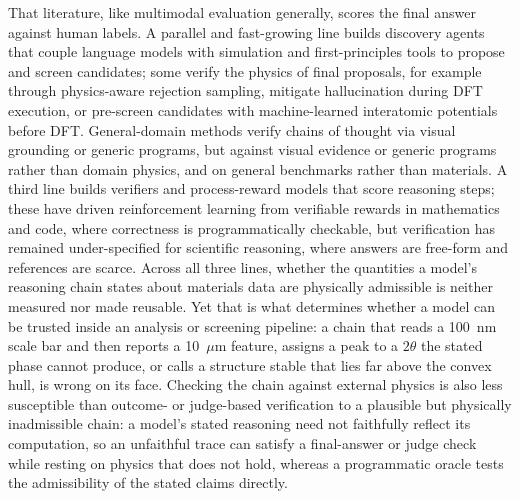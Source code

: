\documentclass[pdflatex,sn-nature]{sn-jnl}
\newcommand{\rev}[1]{#1}
\newcommand{\rev}[1]{{\color{blue}#1}}
\begin{document}
That literature, like multimodal evaluation generally, scores the final answer
against human labels. A parallel and fast-growing line builds discovery agents that
couple language models with simulation and first-principles tools to propose and
screen candidates;\cite{dreams2025,crystalyse2025,mapps2025,atomagents2024,llmatdesign2024,matpc2025,kang2024chatmof,zhang2024honeycomb,survey2025aimat,eaa2026,matty2026}
some verify the physics of final proposals, for example through physics-aware
rejection sampling,\cite{physrej2025} mitigate hallucination during DFT
execution,\cite{dreams2025} or pre-screen candidates with machine-learned
interatomic potentials before DFT.\cite{genbaselines2025,chgnet2023} General-domain
methods verify chains of thought via visual grounding or generic
programs,\cite{corgi2025,mmverify2025,vlmr3_2026,prove2024} but against visual
evidence or generic programs rather than domain physics, and on general benchmarks
rather than materials. A third line builds verifiers and process-reward models that
score reasoning steps;\cite{processbench2025,compassverifier2025,t1verify2025} these
have driven reinforcement learning from verifiable rewards in mathematics and code,
where correctness is programmatically checkable,\cite{deepseekr1_2025} but
verification has remained under-specified for scientific reasoning, where answers are
free-form and references are scarce.\cite{scirlvr2026} Across all three lines, \rev{whether
the quantities a model's reasoning chain states about materials data are physically
admissible} is neither
measured nor made reusable. Yet that is what
determines whether a model can be trusted inside an analysis or screening pipeline:
a chain that reads a 100~nm scale bar and then reports a 10~$\mu$m feature, assigns
a peak to a $2\theta$ the stated phase cannot produce, or calls a structure stable
that lies far above the convex hull, is wrong on its face. Checking the chain against
external physics is also less susceptible than outcome- or judge-based verification to a
plausible but physically inadmissible chain: a model's stated reasoning need not
faithfully reflect its computation, so an unfaithful trace can satisfy a final-answer or
judge check while resting on physics that does not hold, whereas a programmatic oracle
tests the admissibility of the stated claims directly.\cite{faithflow2026}
\end{document}
